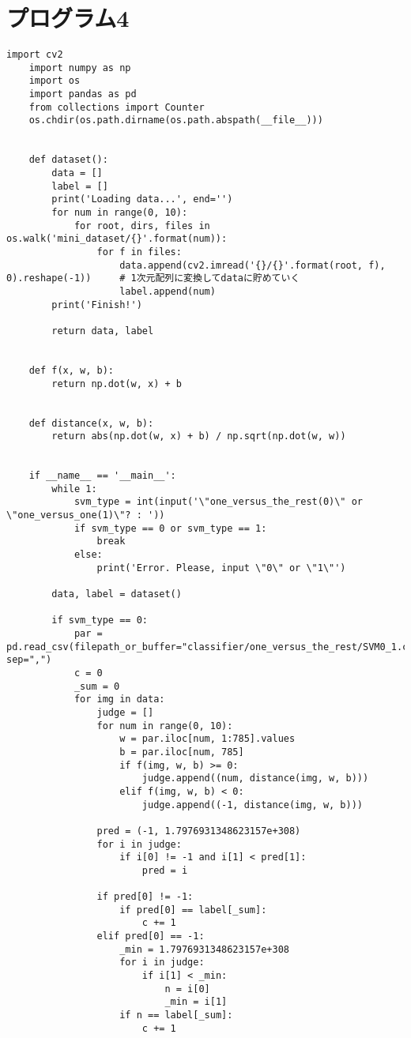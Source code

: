 \section{プログラム4}
\begin{lstlisting}[caption=課題2のMNISTの数字画像識別における識別器の多数決による識別用プログラム]
    import cv2
    import numpy as np
    import os
    import pandas as pd
    from collections import Counter
    os.chdir(os.path.dirname(os.path.abspath(__file__)))


    def dataset():
        data = []
        label = []
        print('Loading data...', end='')
        for num in range(0, 10):
            for root, dirs, files in os.walk('mini_dataset/{}'.format(num)):
                for f in files:
                    data.append(cv2.imread('{}/{}'.format(root, f), 0).reshape(-1))     # 1次元配列に変換してdataに貯めていく
                    label.append(num)
        print('Finish!')

        return data, label


    def f(x, w, b):
        return np.dot(w, x) + b


    def distance(x, w, b):
        return abs(np.dot(w, x) + b) / np.sqrt(np.dot(w, w))


    if __name__ == '__main__':
        while 1:
            svm_type = int(input('\"one_versus_the_rest(0)\" or \"one_versus_one(1)\"? : '))
            if svm_type == 0 or svm_type == 1:
                break
            else:
                print('Error. Please, input \"0\" or \"1\"')

        data, label = dataset()

        if svm_type == 0:
            par = pd.read_csv(filepath_or_buffer="classifier/one_versus_the_rest/SVM0_1.csv", sep=",")
            c = 0
            _sum = 0
            for img in data:
                judge = []
                for num in range(0, 10):
                    w = par.iloc[num, 1:785].values
                    b = par.iloc[num, 785]
                    if f(img, w, b) >= 0:
                        judge.append((num, distance(img, w, b)))
                    elif f(img, w, b) < 0:
                        judge.append((-1, distance(img, w, b)))

                pred = (-1, 1.7976931348623157e+308)
                for i in judge:
                    if i[0] != -1 and i[1] < pred[1]:
                        pred = i

                if pred[0] != -1:
                    if pred[0] == label[_sum]:
                        c += 1
                elif pred[0] == -1:
                    _min = 1.7976931348623157e+308
                    for i in judge:
                        if i[1] < _min:
                            n = i[0]
                            _min = i[1]
                    if n == label[_sum]:
                        c += 1


\end{lstlisting}
